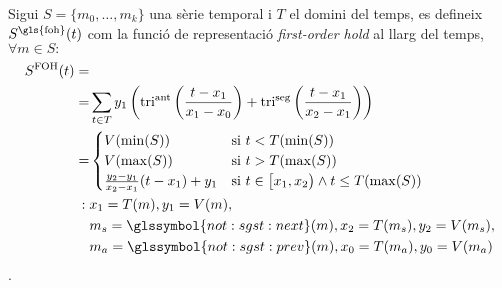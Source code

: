 \begin{definition}
  Sigui $S=\{m_0,\ldots,m_k\}$ una sèrie temporal i $T$ el domini del
  temps, es defineix $S^\text{\gls{foh}}(t)$ com la funció de representació
  \emph{first-order hold} al llarg del temps, $\forall m \in S:$
  \begin{align*}
    S^\text{FOH}(t) = & \\
    = & \sum_{t\in T} y_1
    \left(
      \operatorname{tri}^{\text{ant}}\left(\frac{t-x_1}{x_1-x_0}\right)
      +\operatorname{tri}^{\text{seg}}\left(\frac{t-x_1}{x_2-x_1}\right)
    \right)  \\
    = & \begin{cases}
      V(\min(S)) & \text{si } t<T(\min(S) )\\
      V(\max(S)) & \text{si } t> T(\max(S))  \\
      \frac{y_2-y_1}{x_2-x_1}(t-x_1)+y_1 & \text{si } t\in
      \big[x_1,x_2\big) \wedge t \leq T(\max(S))
    \end{cases}\\
    :\; & x_1=T(m), y_1=V(m), \\
    & m_s=\glssymbol{not:sgst:next}(m), x_2=T(m_s), y_2=V(m_s),\\
    & m_a=\glssymbol{not:sgst:prev}(m), x_0=T(m_a), y_0=V(m_a) 
  \end{align*}.
\end{definition}




